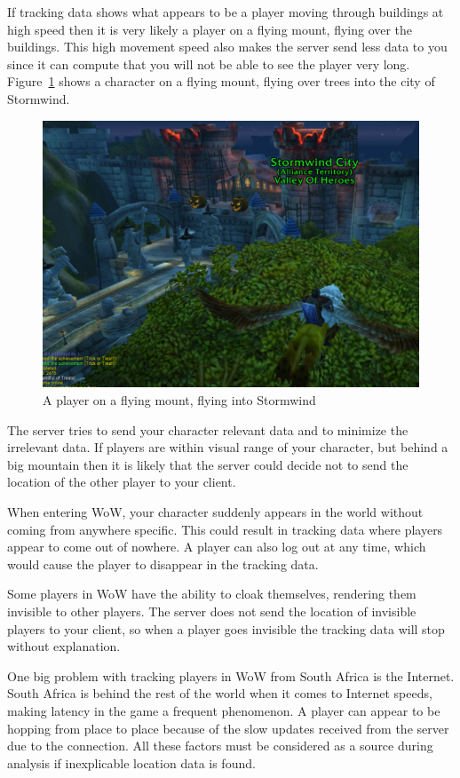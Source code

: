 If tracking data shows what appears to be a player moving through buildings at high speed then it is very likely a player on a flying mount, flying over the buildings. This high movement speed also makes the server send less data to you since it can compute that you will not be able to see the player very long. Figure~\ref{flymount} shows a character on a flying mount, flying over trees into the city of Stormwind.

\begin{figure}[htbp]
\centering
\includegraphics[scale = 0.65]{flystormwind1.png}	
\caption{A player on a flying mount, flying into Stormwind}
\label{flymount}
\end{figure}


The server tries to send your character relevant data and to minimize the irrelevant data. If players are within visual range of your character, but behind a big mountain then it is likely that the server could decide not to send the location of the other player to your client.

When entering WoW, your character suddenly appears in the world without coming from anywhere specific. This could result in tracking data where players appear to come out of nowhere. A player can also log out at any time, which would cause the player to disappear in the tracking data.

Some players in WoW have the ability to cloak themselves, rendering them invisible to other players. The server does not send the location of invisible players to your client, so when a player goes invisible the tracking data will stop without explanation. 

One big problem with tracking players in WoW from South Africa is the Internet. South Africa is behind the rest of the world when it comes to Internet speeds, making latency in the game a frequent phenomenon. A player can appear to be hopping from place to place because of the slow updates received from the server due to the connection. 
All these factors must be considered as a source during analysis if inexplicable location data is found.

